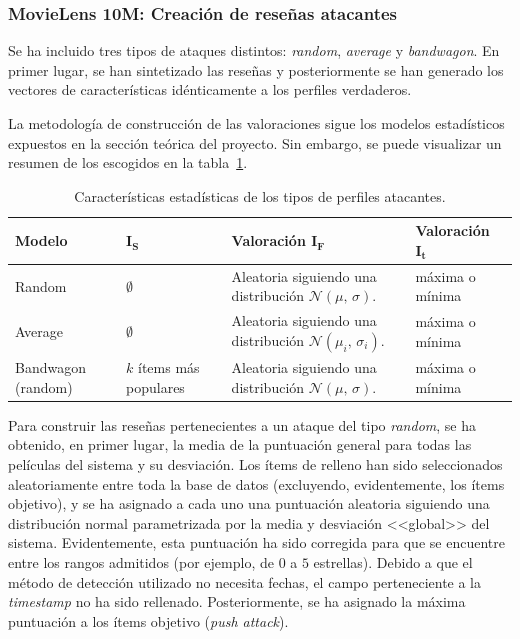 \subsubsection{MovieLens 10M: Creación de reseñas atacantes}

Se ha incluido tres tipos de ataques distintos: \textit{random}, \textit{average} y \textit{bandwagon}. En primer lugar, se han sintetizado las reseñas y posteriormente se han generado los vectores de características idénticamente a los perfiles verdaderos.

La metodología de construcción de las valoraciones sigue los modelos estadísticos expuestos en la sección teórica del proyecto. Sin embargo, se puede visualizar un resumen de los escogidos en la tabla~\ref{ataques_coforest}.

\begin{table}
\begin{centering}
	
	\begin{tabular}{@{}p{5em} p{5em} p{11em} p{9em}@{}}
		\toprule
		\textbf{Modelo} & $\mathbf{I_S}$ & \textbf{Valoración} $\mathbf{I_F}$ &  \textbf{Valoración} $\mathbf{I_t}$\\ 
		\midrule
		Random & $\emptyset$ & Aleatoria siguiendo una distribución $\mathcal{N}(\mu,\,\sigma)$. & máxima o mínima \\
		Average & $\emptyset$ & Aleatoria siguiendo una distribución $\mathcal{N}(\mu_i,\,\sigma_i)$. & máxima o mínima\\
		Bandwagon (random) & $k$ ítems más populares & Aleatoria siguiendo una distribución $\mathcal{N}(\mu,\,\sigma)$. & máxima o mínima\\
		\bottomrule
	\end{tabular}
	\caption{Características estadísticas de los tipos de perfiles atacantes.}
	\label{ataques_coforest}	

\end{centering}
\end{table}

Para construir las reseñas pertenecientes a un ataque del tipo \textit{random}, se ha obtenido, en primer lugar, la media de la puntuación general para todas las películas del sistema y su desviación. Los ítems de relleno han sido seleccionados aleatoriamente entre toda la base de datos (excluyendo, evidentemente, los ítems objetivo), y se ha asignado a cada uno una puntuación aleatoria siguiendo una distribución normal parametrizada por la media y desviación <<global>> del sistema. Evidentemente, esta puntuación ha sido corregida para que se encuentre entre los rangos admitidos (por ejemplo, de $0$ a $5$ estrellas). Debido a que el método de detección utilizado no necesita fechas, el campo perteneciente a la \textit{timestamp} no ha sido rellenado. Posteriormente, se ha asignado la máxima puntuación a los ítems objetivo (\textit{push attack}).

